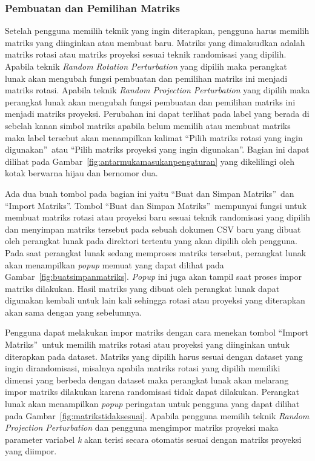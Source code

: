 \subsubsection{Pembuatan dan Pemilihan Matriks}
\label{subsubsec:pilihmatriks}

Setelah pengguna memilih teknik yang ingin diterapkan, pengguna harus memilih matriks yang diinginkan atau membuat baru. Matriks yang dimaksudkan adalah matriks rotasi atau matriks proyeksi sesuai teknik randomisasi yang dipilih. Apabila teknik \textit{Random Rotation Perturbation} yang dipilih maka perangkat lunak akan mengubah fungsi pembuatan dan pemilihan matriks ini menjadi matriks rotasi. Apabila teknik \textit{Random Projection Perturbation} yang dipilih maka perangkat lunak akan mengubah fungsi pembuatan dan pemilihan matriks ini menjadi matriks proyeksi. Perubahan ini dapat terlihat pada label yang berada di sebelah kanan simbol matriks apabila belum memilih atau membuat matriks maka label tersebut akan menampilkan kalimat \textquotedblleft Pilih matriks rotasi yang ingin digunakan\textquotedblright~atau \textquotedblleft Pilih matriks proyeksi yang ingin digunakan\textquotedblright. Bagian ini dapat dilihat pada Gambar~\ref{fig:antarmukamasukanpengaturan} yang dikelilingi oleh kotak berwarna hijau dan bernomor dua.

Ada dua buah tombol pada bagian ini yaitu \textquotedblleft Buat dan Simpan Matriks\textquotedblright~dan \textquotedblleft Import Matriks\textquotedblright. Tombol \textquotedblleft Buat dan Simpan Matriks\textquotedblright~mempunyai fungsi untuk membuat matriks rotasi atau proyeksi baru sesuai teknik randomisasi yang dipilih dan menyimpan matriks tersebut pada sebuah dokumen CSV baru yang dibuat oleh perangkat lunak pada direktori tertentu yang akan dipilih oleh pengguna. Pada saat perangkat lunak sedang memproses matriks tersebut, perangkat lunak akan menampilkan \textit{popup} memuat yang dapat dilihat pada Gambar~\ref{fig:buatsimpanmatriks}. \textit{Popup} ini juga akan tampil saat proses impor matriks dilakukan. Hasil matriks yang dibuat oleh perangkat lunak dapat digunakan kembali untuk lain kali sehingga rotasi atau proyeksi yang diterapkan akan sama dengan yang sebelumnya. 

Pengguna dapat melakukan impor matriks dengan cara menekan tombol \textquotedblleft Import Matriks\textquotedblright~untuk memilih matriks rotasi atau proyeksi yang diinginkan untuk diterapkan pada dataset. Matriks yang dipilih harus sesuai dengan dataset yang ingin dirandomisasi, misalnya apabila matriks rotasi yang dipilih memiliki dimensi yang berbeda dengan dataset maka perangkat lunak akan melarang impor matriks dilakukan karena randomisasi tidak dapat dilakukan. Perangkat lunak akan menampilkan \textit{popup} peringatan untuk pengguna yang dapat dilihat pada Gambar~\ref{fig:matrikstidaksesuai}. Apabila pengguna memilih teknik \textit{Random Projection Perturbation} dan pengguna mengimpor matriks proyeksi maka parameter variabel \textit{k} akan terisi secara otomatis sesuai dengan matriks proyeksi yang diimpor.

